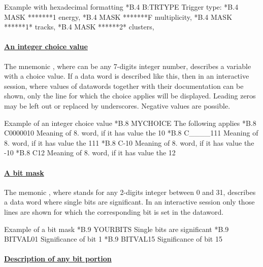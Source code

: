 \begin{XMPt}{Example with hexadecimal formatting}
*B.4   B:TRTYPE   Trigger type: 
*B.4   MASK       *******1 energy,
*B.4   MASK       *******F multiplicity,
*B.4   MASK       ******1* tracks,
*B.4   MASK       ******2* clusters,
\end{XMPt}
 
\paragraph{\underline{\bf An integer choice value}}
 
The mnemonic , where  can be any 7-digits integer
number, describes a variable with a choice value. 
If a data word is described like this, 
then in an interactive session, where values of
datawords together with their documentation can be shown,
only the line for which the choice applies will be displayed.
Leading zeros may be left out or replaced by underscores. 
Negative values are possible.
 
\begin{XMPt}{Example of an integer choice value}
*B.8      MYCHOICE   The following applies
*B.8      C0000010   Meaning of 8. word, if it has value the 10
*B.8      C____111   Meaning of 8. word, if it has value the 111
*B.8      C-10       Meaning of 8. word, if it has value the -10
*B.8      C12        Meaning of 8. word, if it has value the 12
\end{XMPt}
 
\paragraph{\underline{\bf A bit mask}}
 
The memonic , where  stands for any 2-digits integer
between 0 and 31, describes a data word where single bits are significant. 
In an interactive session only those lines are shown
for which the corresponding bit is set in the dataword.
 
\begin{XMPt}{Example of a bit mask}
*B.9      YOURBITS  Single bits are significant
*B.9      BITVAL01  Significance of bit 1
*B.9      BITVAL15  Significance of bit 15
\end{XMPt}
 
\paragraph{\underline{\bf Description of any bit portion}}
 
